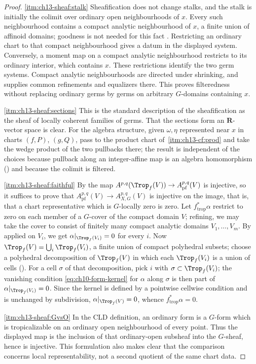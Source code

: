 \begin{proof}
\cref{itm:ch13-sheaf:stalk} Sheafification does not change stalks, and the
stalk is initially the colimit over ordinary open neighbourhoods of $x$.
Every such neighbourhood contains a compact analytic neighbourhood of $x$,
a finite union of affinoid domains; goodness is not needed for this fact
\cite[\S11.1.7 and Lemma~11.1.15]{CLD25}.  Restricting an ordinary chart
to that compact neighbourhood gives a datum in the displayed system.
Conversely, a moment map on a compact analytic neighbourhood restricts to
its ordinary interior, which contains $x$.  These restrictions identify
the two germ systems.  Compact analytic neighbourhoods are directed under
shrinking, and  supplies common refinements
and equalizers there.  This proves filteredness without replacing ordinary
germs by germs on arbitrary $G$-domains containing $x$.

\cref{itm:ch13-sheaf:sections} This is the standard description of the
sheafification as the sheaf of locally coherent families of germs.  That the
sections form an $\mathbf R$-vector space is clear.  For the algebra
structure, given $\omega,\eta$ represented near $x$ in charts $(f,P)$,
$(g,Q)$, pass to the product chart of
\,\cref{itm:ch13-cf:prod} and take the wedge
product of the two pullbacks there; the result is independent of the choices
because pullback along an integer-affine map is an algebra homomorphism
() and because the colimit is
filtered.

\cref{itm:ch13-sheaf:faithful} By  the map
$A^{p,q}(\Trop_f(V))\to A^{p,q}_{\mathrm{pf}}(V)$ is injective, so it
suffices to prove that
$A^{p,q}_{\mathrm{pf}}(V)\to A^{p,q}_{X,G}(V)$ is injective on the image,
that is, that a chart representative which is $G$-locally zero is zero.  Let
$f_{\mathrm{trop}}^*\alpha$ restrict to zero on each member of a $G$-cover of
the compact domain $V$; refining, we may take the cover to consist of
finitely many compact analytic domains $V_1,\ldots,V_m$.  By
 applied on $V_i$, we get
$\alpha|_{\Trop_f(V_i)}=0$ for every $i$.  Now
$\Trop_f(V)=\bigcup_i\Trop_f(V_i)$, a finite union of compact polyhedral
subsets; choose a polyhedral decomposition of $\Trop_f(V)$ in which each
$\Trop_f(V_i)$ is a union of cells ().
For a cell $\sigma$ of that decomposition, pick $i$ with
$\sigma\subset\Trop_f(V_i)$; the vanishing condition
\eqref{eq:ch10-form-kernel} for $\alpha$ along $\sigma$ is then part of
$\alpha|_{\Trop_f(V_i)}=0$.  Since the kernel is defined by a pointwise
cellwise condition and is unchanged by subdivision, $\alpha|_{\Trop_f(V)}=0$,
whence $f_{\mathrm{trop}}^*\alpha=0$.

\cref{itm:ch13-sheaf:GvsO} In the CLD definition, an ordinary form is a
$G$-form which is tropicalizable on an ordinary open neighbourhood of every
point.  Thus the displayed map is the inclusion of that ordinary-open
subsheaf into the $G$-sheaf, hence is injective.  This formulation also makes
clear that the comparison concerns local representability, not a second
quotient of the same chart data.
\end{proof}

